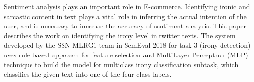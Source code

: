 Sentiment analysis plays an important role in E-commerce. Identifying ironic and sarcastic content in text plays a vital role in inferring the actual intention of the user, and is necessary to increase the accuracy of sentiment analysis. This paper describes the work on identifying the irony level in twitter texts. The system developed by the SSN MLRG1 team in SemEval-2018 for task 3 (irony detection) uses rule based approach for feature selection and MultiLayer Perceptron (MLP) technique to build the model for multiclass irony classification subtask, which classifies the given text into one of the four class labels.
